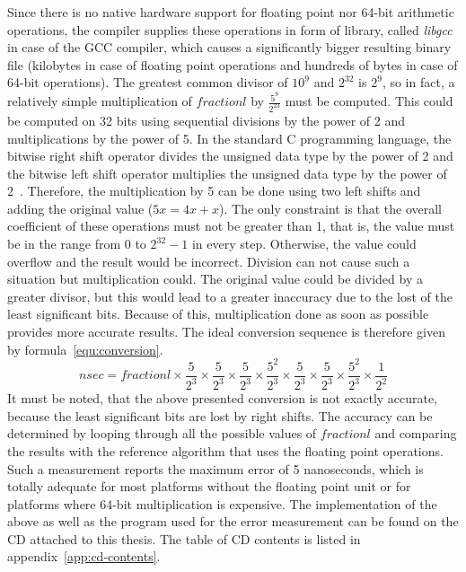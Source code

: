 Since there is no native hardware support for floating point nor 64-bit arithmetic operations,
the compiler supplies these operations in form of library, called {\it{libgcc}} in case of the GCC compiler,
which causes a significantly bigger resulting binary file
(kilobytes in case of floating point operations and hundreds of bytes in case of 64-bit operations).
The greatest common divisor of $10^9$ and $2^{32}$ is $2^9$,
so in fact, a relatively simple multiplication of $fractionl$ by $\frac{5^9}{2^{23}}$ must be computed.
This could be computed on 32 bits using sequential
divisions by the power of 2 and multiplications by the power of 5.
In the standard C programming language, the bitwise right shift operator divides the unsigned data type by the power of 2
and the bitwise left shift operator multiplies the unsigned data type by the power of 2~\cite{c99}.
Therefore, the multiplication by 5 can be done using two left shifts and
adding the original value ($5x = 4x + x$).
The only constraint is that the overall coefficient of these operations must not be greater than 1,
that is, the value must be in the range from $0$ to $2^{32}-1$ in every step.
Otherwise, the value could overflow and the result would be incorrect.
Division can not cause such a situation but multiplication could.
The original value could be divided by a greater divisor,
but this would lead to a greater inaccuracy due to the lost of the least significant bits.
Because of this, multiplication done as soon as possible provides more accurate results.
The ideal conversion sequence is therefore given by formula~\ref{equ:conversion}.
\begin{equation}
\label{equ:conversion}
nsec = fractionl \times \frac{5}{2^3} \times \frac{5}{2^3} \times \frac{5}{2^3} \times \frac{5^2}{2^3} \times \frac{5}{2^3}  \times \frac{5}{2^3} \times \frac{5^2}{2^3} \times \frac{1}{2^2}
\end{equation}
It must be noted, that the above presented conversion is not exactly accurate,
because the least significant bits are lost by right shifts. %
The accuracy can be determined by looping through all the possible values of $fractionl$ %
and comparing the results with the reference algorithm that uses the floating point operations.
Such a measurement reports the maximum error of 5 nanoseconds,
which is totally adequate for most platforms without the floating point unit or
for platforms where 64-bit multiplication is expensive.
The implementation of the above as well as the program used for the
error measurement can be found on the CD attached to this thesis.
The table of CD contents is listed in appendix~\ref{app:cd-contents}.

